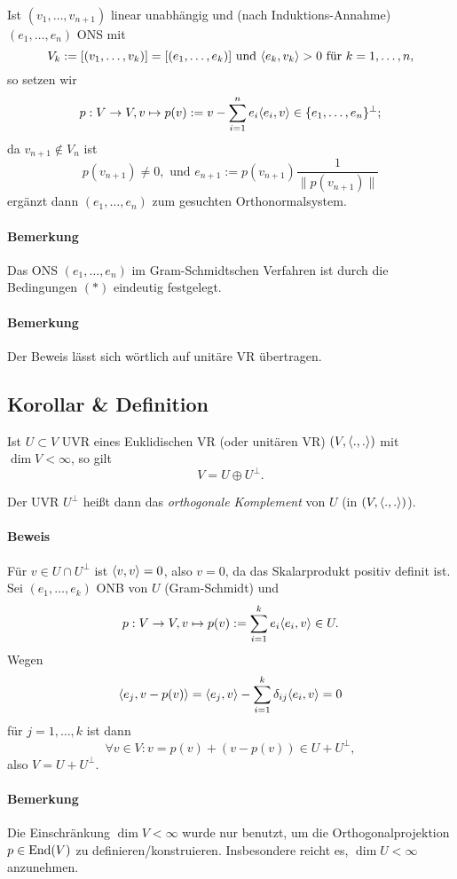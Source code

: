 	Ist $ (v_1,\dots,v_{n+1}) $ linear unabhängig und (nach Induktions-Annahme) $ (e_1,\dots,e_n) $ ONS mit
		\[ V_k := [(v_1,\dots,v_k)] = [(e_1,\dots,e_k)] \text{ und } \langle e_k,v_k \rangle > 0 \text{ für } k = 1,\dots,n, \]
	so setzen wir
		\[ p:V\to V, v\mapsto p(v):= v-\sum_{i=1}^{n}e_i\langle e_i,v \rangle\in \{e_1,\dots,e_n\}^\perp; \]
	da $ v_{n+1}\notin V_n $ ist
		\[ p(v_{n+1}) \neq 0, \text{ und } e_{n+1} := p(v_{n+1})\frac{1}{\|p(v_{n+1})\|} \]
	ergänzt dann $ (e_1,\dots,e_n) $ zum gesuchten Orthonormalsystem.
\paragraph{Bemerkung}
	Das ONS $ (e_1,\dots,e_n) $ im Gram-Schmidtschen Verfahren ist durch die Bedingungen $ (*) $ eindeutig festgelegt.
\paragraph{Bemerkung}
	Der Beweis lässt sich wörtlich auf unitäre VR übertragen.

\subsection{Korollar \& Definition}
\begin{Korollar}
	Ist $ U\subset V $ UVR eines Euklidischen VR (oder unitären VR) $ (V,\langle .,. \rangle) $ mit $ \dim V<\infty $, so gilt
		\[ V = U\oplus U^\perp. \]
\end{Korollar}
\begin{Definition}
	Der UVR $ U^\perp $ heißt dann das \emph{orthogonale Komplement} von $ U $ (in $ (V,\langle .,. \rangle) $).
\end{Definition}
\paragraph{Beweis}
	Für $ v\in U\cap U^\perp $ ist $ \langle v,v \rangle = 0 $, also $ v = 0 $, da das Skalarprodukt positiv definit ist. Sei $ (e_1,\dots,e_k) $ ONB von $ U $ (Gram-Schmidt) und
		\[ p:V\to V, v\mapsto p(v) := \sum_{i=1}^{k}e_i\langle e_i,v \rangle\in U. \]
	Wegen
		\[ \langle e_j,v-p(v) \rangle = \langle e_j,v \rangle-\sum_{i=1}^{k}\delta_{ij}\langle e_i,v \rangle = 0 \]
	für $ j = 1,\dots, k $ ist dann
		\[ \forall v\in V:v=p(v) + (v-p(v))\in U+U^\perp, \]
	also $ V = U+U^\perp $.
\paragraph{Bemerkung}
	Die Einschränkung $ \dim V < \infty $ wurde nur benutzt, um die Orthogonalprojektion $ p\in \operatorname{End}(V) $ zu definieren/konstruieren. Insbesondere reicht es, $ \dim U < \infty $ anzunehmen.
